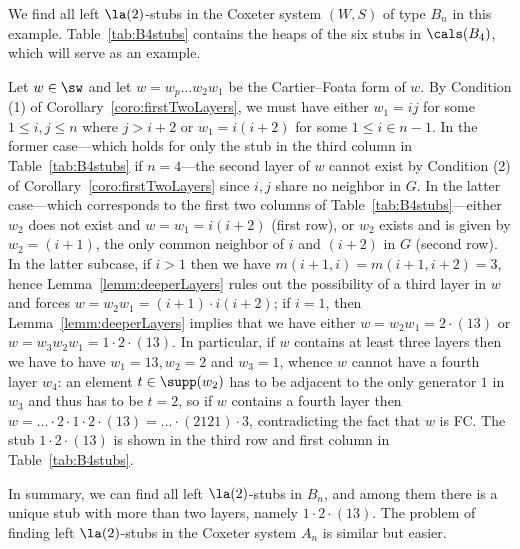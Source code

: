 \begin{example}
    \label{eg:layerAnalysis} 
    We find all left $\la(2)$-stubs in the Coxeter system $(W,S)$ of type $B_n$ in this example.
    Table~\ref{tab:B4stubs} contains the heaps of the six stubs in $\cals(B_4)$, which will serve as an example. 

    Let $w\in\sw$ and let $w=w_p\dots w_2w_1$ be the Cartier--Foata form of $w$.  By Condition (1)
    of Corollary~\ref{coro:firstTwoLayers}, we must have either $w_1=ij$ for some $1\le i,j\le n$ where
    $j>i+2$ or $w_1=i(i+2)$ for some $1\le i\in n-1$. In the former case---which holds for only the
    stub in the third column in Table~\ref{tab:B4stubs} if $n=4$---the second layer of $w$ cannot exist
    by Condition (2) of Corollary~\ref{coro:firstTwoLayers} since $i,j$ share no neighbor in $G$.  In the
    latter case---which corresponds to the first two columns of Table~\ref{tab:B4stubs}---either $w_2$
    does not exist and $w=w_1=i(i+2)$ (first row), or $w_2$ exists and is given by $w_2=(i+1)$, the
    only common neighbor of $i$ and $(i+2)$ in $G$ (second row). In the latter subcase, if $i>1$
    then we have $m(i+1,i)=m(i+1,i+2)=3$, hence Lemma~\ref{lemm:deeperLayers} rules out the possibility
    of a third layer in $w$ and forces $w=w_2w_1=(i+1)\cdot i(i+2)$; if $i=1$, then
    Lemma~\ref{lemm:deeperLayers} implies that we have either $w=w_{2}w_1=2\cdot (13)$ or
    $w=w_3w_2w_1=1\cdot 2\cdot (13)$. In particular, if $w$ contains at least three layers then we
    have to have $w_1=13, w_2=2$ and $w_3=1$, whence $w$ cannot have a fourth layer $w_4$: an
    element $t\in \supp(w_2)$ has to be adjacent to the only generator $1$ in $w_3$ and thus has to
    be $t=2$, so if $w$ contains a fourth layer then $w=\dots\cdot 2\cdot 1\cdot 2\cdot
    (13)=\dots\cdot (2121)\cdot 3$, contradicting the fact that $w$ is FC. The stub $1\cdot 2\cdot
    (13)$ is shown in the third row and first column in Table~\ref{tab:B4stubs}.

    In summary, we can find all left $\la(2)$-stubs in $B_n$, and among them there is a unique stub
    with more than two layers, namely $1\cdot 2\cdot (13)$. The problem of finding left
    $\la(2)$-stubs in the Coxeter system $A_n$ is similar but easier.
\end{example}


